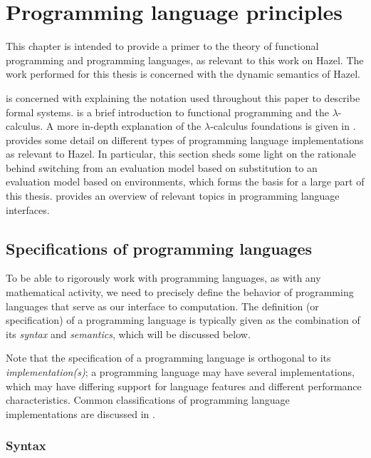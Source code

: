 \chapter{Programming language principles}
\label{sec:prog_lang_principles}

This chapter is intended to provide a primer to the theory of functional programming and programming languages, as relevant to this work on Hazel. The work performed for this thesis is concerned with the dynamic semantics of Hazel.

 is concerned with explaining the notation used throughout this paper to describe formal systems.  is a brief introduction to functional programming and the $\lambda$-calculus. A more in-depth explanation of the $\lambda$-calculus foundations is given in .  provides some detail on different types of programming language implementations as relevant to Hazel. In particular, this section sheds some light on the rationale behind switching from an evaluation model based on substitution to an evaluation model based on environments, which forms the basis for a large part of this thesis.  provides an overview of relevant topics in programming language interfaces.

\section{Specifications of programming languages}
\label{sec:prog-lang-def}

To be able to rigorously work with programming languages, as with any mathematical activity, we need to precisely define the behavior of programming languages that serve as our interface to computation. The definition (or specification) of a programming language is typically given as the combination of its \textit{syntax} and \textit{semantics}, which will be discussed below.

Note that the specification of a programming language is orthogonal to its \textit{implementation(s)}; a programming language may have several implementations, which may have differing support for language features and different performance characteristics. Common classifications of programming language implementations are discussed in .

\subsection{Syntax}
\label{sec:syntax}

